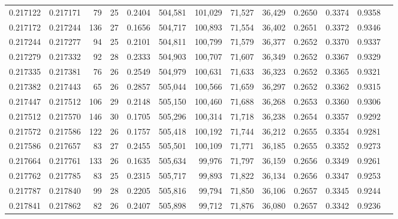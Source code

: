 \begin{tabular}{rrrrrrrrrrrrr}
0.217122 & 0.217171 &  79 &  25 &                                     0.2404 & 504,581 & 101,029 &  71,527 &  36,429 & 0.2650 & 0.3374 & 0.9358 \\
0.217172 & 0.217244 & 136 &  27 &                                     0.1656 & 504,717 & 100,893 &  71,554 &  36,402 & 0.2651 & 0.3372 & 0.9346 \\
0.217244 & 0.217277 &  94 &  25 &                                     0.2101 & 504,811 & 100,799 &  71,579 &  36,377 & 0.2652 & 0.3370 & 0.9337 \\
0.217279 & 0.217332 &  92 &  28 &                                     0.2333 & 504,903 & 100,707 &  71,607 &  36,349 & 0.2652 & 0.3367 & 0.9329 \\
0.217335 & 0.217381 &  76 &  26 &                                     0.2549 & 504,979 & 100,631 &  71,633 &  36,323 & 0.2652 & 0.3365 & 0.9321 \\
0.217382 & 0.217443 &  65 &  26 &                                     0.2857 & 505,044 & 100,566 &  71,659 &  36,297 & 0.2652 & 0.3362 & 0.9315 \\
0.217447 & 0.217512 & 106 &  29 &                                     0.2148 & 505,150 & 100,460 &  71,688 &  36,268 & 0.2653 & 0.3360 & 0.9306 \\
0.217512 & 0.217570 & 146 &  30 &                                     0.1705 & 505,296 & 100,314 &  71,718 &  36,238 & 0.2654 & 0.3357 & 0.9292 \\
0.217572 & 0.217586 & 122 &  26 &                                     0.1757 & 505,418 & 100,192 &  71,744 &  36,212 & 0.2655 & 0.3354 & 0.9281 \\
0.217586 & 0.217657 &  83 &  27 &                                     0.2455 & 505,501 & 100,109 &  71,771 &  36,185 & 0.2655 & 0.3352 & 0.9273 \\
0.217664 & 0.217761 & 133 &  26 &                                     0.1635 & 505,634 &  99,976 &  71,797 &  36,159 & 0.2656 & 0.3349 & 0.9261 \\
0.217762 & 0.217785 &  83 &  25 &                                     0.2315 & 505,717 &  99,893 &  71,822 &  36,134 & 0.2656 & 0.3347 & 0.9253 \\
0.217787 & 0.217840 &  99 &  28 &                                     0.2205 & 505,816 &  99,794 &  71,850 &  36,106 & 0.2657 & 0.3345 & 0.9244 \\
0.217841 & 0.217862 &  82 &  26 &                                     0.2407 & 505,898 &  99,712 &  71,876 &  36,080 & 0.2657 & 0.3342 & 0.9236 \\

\end{tabular}

